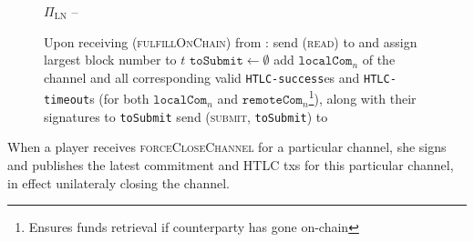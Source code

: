   \begin{figure}[H]
    \begin{protocolbox}{$\Pi_{\mathrm{LN}}$ -- }
      \begin{algorithmic}[1]
        \State Upon receiving (\textsc{fulfillOnChain}) from \environment:
        \label{alg:protocol:pay:foc:top}
        \Indent
          \State send (\textsc{read}) to \ledger{} and assign largest block
          number to $t$
          \label{alg:protocol:pay:foc:read}
          \State $\mathtt{toSubmit} \gets \emptyset$
          \label{alg:protocol:pay:foc:tosubmit}
              \State add $\mathtt{localCom}_n$ of the channel and all
              corresponding valid \texttt{HTLC-success}es and
              \texttt{HTLC-timeout}s (for both $\mathtt{localCom}_n$ and
              $\mathtt{remoteCom}_n$\footnote{Ensures funds retrieval if
              counterparty has gone on-chain}), along with their signatures to
              \texttt{toSubmit}
            \EndIf
          \EndFor
          \State send (\textsc{submit}, \texttt{toSubmit}) to \ledger
          \label{alg:protocol:pay:foc:submit}
        \EndIndent
      \end{algorithmic}
    \end{protocolbox}
    \caption{}
    \label{alg:protocol:pay:foc}
  \end{figure}

  When a player receives \textsc{forceCloseChannel} for a particular channel,
  she signs and publishes the latest commitment and HTLC txs for this particular
  channel, in effect unilateraly closing the channel.

